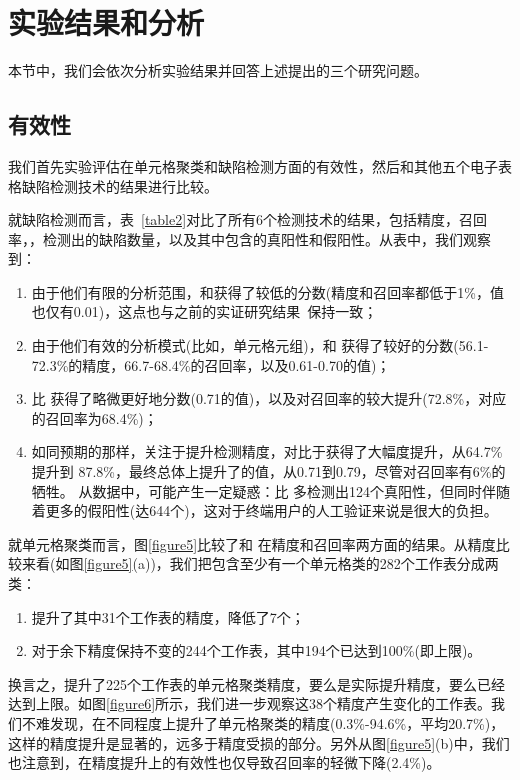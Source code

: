 \section{实验结果和分析}

本节中，我们会依次分析实验结果并回答上述提出的三个研究问题。

\subsection{有效性}

我们首先实验评估\wa 在单元格聚类和缺陷检测方面的有效性，然后和其他五个电子表格缺陷检测技术的结果进行比较。



就缺陷检测而言，表~\ref{table2}对比了所有6个检测技术的结果，包括精度，召回率，\fmd，检测出的缺陷数量，以及其中包含的真阳性和假阳性。从表中，我们观察到：

\begin{enumerate}
    \item 由于他们有限的分析范围，\uc 和\di 获得了较低的分数(精度和召回率都低于1\%，\fmd 值也仅有0.01)，这点也与之前的实证研究结果~\cite{zhang2017effectively}保持一致；
    \item 由于他们有效的分析模式(比如，单元格元组)，\am 和 \ca 获得了较好的分数(56.1-72.3\%的精度，66.7-68.4\%的召回率，以及0.61-0.70的\fm 值)；
    \item \cu 比 \ca 获得了略微更好地分数(0.71的\fm 值)，以及对召回率的较大提升(72.8\%，对应的\ca 召回率为68.4\%)；
    \item 如同预期的那样，\wa 关注于提升检测精度，对比于\cu 获得了大幅度提升，从64.7\% 提升到 87.8\%，最终总体上提升了\fmd 的值，从0.71到0.79，尽管对召回率有6\%的牺牲。 从数据中，可能产生一定疑惑：\cu 比 \wa 多检测出124个真阳性，但同时伴随着更多的假阳性(达644个)，这对于终端用户的人工验证来说是很大的负担。
\end{enumerate}



就单元格聚类而言，图\ref{figure5}比较了\cu 和 \wa 在精度和召回率两方面的结果。从精度比较来看(如图\ref{figure5}(a))，我们把包含至少有一个单元格类的282个工作表分成两类：
\begin{enumerate}
    \item \wa 提升了其中31个工作表的精度，降低了7个；
    \item 对于余下精度保持不变的244个工作表，其中194个已达到100\%(即上限)。
\end{enumerate}
换言之，\wa 提升了225个工作表的单元格聚类精度，要么是实际提升精度，要么已经达到上限。如图\ref{figure6}所示，我们进一步观察这38个精度产生变化的工作表。我们不难发现，\wa 在不同程度上提升了单元格聚类的精度(0.3\%-94.6\%，平均20.7\%)，这样的精度提升是显著的，远多于精度受损的部分。另外从图\ref{figure5}(b)中，我们也注意到，\wa 在精度提升上的有效性也仅导致召回率的轻微下降(2.4\%)。


